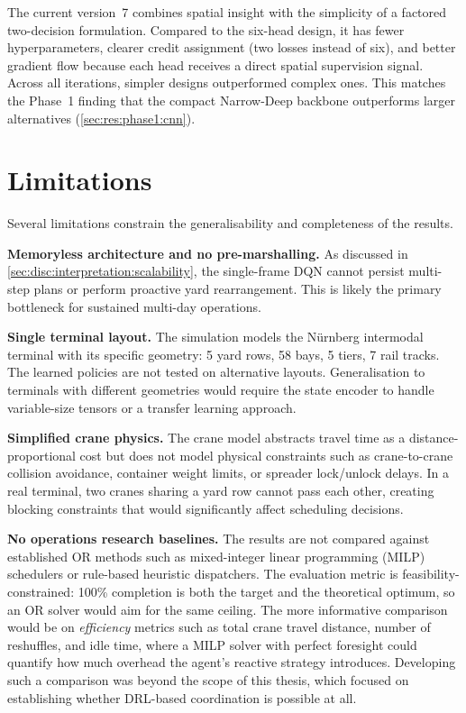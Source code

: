 The current version~7 combines spatial insight with the simplicity of a factored two-decision formulation. Compared to the six-head design, it has fewer hyperparameters, clearer credit assignment (two losses instead of six), and better gradient flow because each head receives a direct spatial supervision signal. Across all iterations, simpler designs outperformed complex ones. This matches the Phase~1 finding that the compact Narrow-Deep backbone outperforms larger alternatives (\cref{sec:res:phase1:cnn}).

\section{Limitations}
\label{sec:disc:limitations}

Several limitations constrain the generalisability and completeness of the results.

\textbf{Memoryless architecture and no pre-marshalling.} As discussed in \cref{sec:disc:interpretation:scalability}, the single-frame DQN cannot persist multi-step plans or perform proactive yard rearrangement. This is likely the primary bottleneck for sustained multi-day operations.

\textbf{Single terminal layout.} The simulation models the N\"urnberg intermodal terminal with its specific geometry: 5 yard rows, 58 bays, 5 tiers, 7 rail tracks. The learned policies are not tested on alternative layouts. Generalisation to terminals with different geometries would require the state encoder to handle variable-size tensors or a transfer learning approach.

\textbf{Simplified crane physics.} The crane model abstracts travel time as a distance-proportional cost but does not model physical constraints such as crane-to-crane collision avoidance, container weight limits, or spreader lock/unlock delays. In a real terminal, two cranes sharing a yard row cannot pass each other, creating blocking constraints that would significantly affect scheduling decisions.

\textbf{No operations research baselines.} The results are not compared against established OR methods such as mixed-integer linear programming (MILP) schedulers or rule-based heuristic dispatchers. The evaluation metric is feasibility-constrained: 100\% completion is both the target and the theoretical optimum, so an OR solver would aim for the same ceiling. The more informative comparison would be on \emph{efficiency} metrics such as total crane travel distance, number of reshuffles, and idle time, where a MILP solver with perfect foresight could quantify how much overhead the agent's reactive strategy introduces. Developing such a comparison was beyond the scope of this thesis, which focused on establishing whether DRL-based coordination is possible at all.

